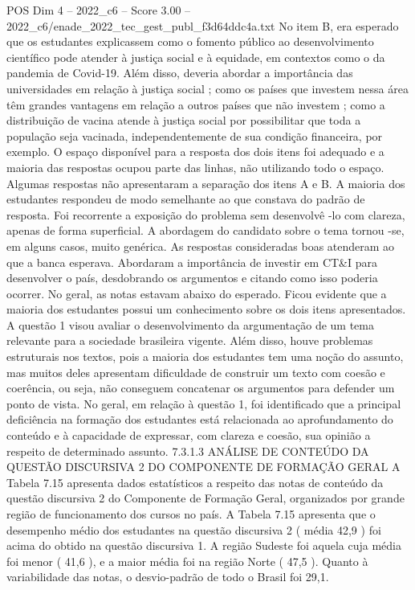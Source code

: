 \begin{textsample}{POS Dim 4 – 2022\_c6 – Score 3.00 – 2022\_c6/enade\_2022\_tec\_gest\_publ\_f3d64ddc4a.txt}
No item B, era esperado que os estudantes explicassem como o fomento público ao desenvolvimento científico pode atender à justiça social e à equidade, em contextos como o da pandemia de Covid-19.
Além disso, deveria abordar a importância das universidades em relação à justiça social ; como os países que investem nessa área têm grandes vantagens em relação a outros países que não investem ; como a distribuição de vacina atende à justiça social por possibilitar que toda a população seja vacinada, independentemente de sua condição financeira, por exemplo.
O espaço disponível para a resposta dos dois itens foi adequado e a maioria das respostas ocupou parte das linhas, não utilizando todo o espaço.
Algumas respostas não apresentaram a separação dos itens A e B.
A maioria dos estudantes respondeu de modo semelhante ao que constava do padrão de resposta.
Foi recorrente a exposição do problema sem desenvolvê -lo com clareza, apenas de forma superficial.
A abordagem do candidato sobre o tema tornou -se, em alguns casos, muito genérica.
As respostas consideradas boas atenderam ao que a banca esperava.
Abordaram a importância de investir em CT\&I para desenvolver o país, desdobrando os argumentos e citando como isso poderia ocorrer.
No geral, as notas estavam abaixo do esperado.
Ficou evidente que a maioria dos estudantes possui um conhecimento sobre os dois itens apresentados.
A questão 1 visou avaliar o desenvolvimento da argumentação de um tema relevante para a sociedade brasileira vigente.
Além disso, houve problemas estruturais nos textos, pois a maioria dos estudantes tem uma noção do assunto, mas muitos deles apresentam dificuldade de construir um texto com coesão e coerência, ou seja, não conseguem concatenar os argumentos para defender um ponto de vista.
No geral, em relação à questão 1, foi identificado que a principal deficiência na formação dos estudantes está relacionada ao aprofundamento do conteúdo e à capacidade de expressar, com clareza e coesão, sua opinião a respeito de determinado assunto. 7.3.1.3 ANÁLISE DE CONTEÚDO DA QUESTÃO DISCURSIVA 2 DO COMPONENTE DE FORMAÇÃO GERAL A Tabela 7.15 apresenta dados estatísticos a respeito das notas de conteúdo da questão discursiva 2 do Componente de Formação Geral, organizados por grande região de funcionamento dos cursos no país.
A Tabela 7.15 apresenta que o desempenho médio dos estudantes na questão discursiva 2 ( média 42,9 ) foi acima do obtido na questão discursiva 1.
A região Sudeste foi aquela cuja média foi menor ( 41,6 ), e a maior média foi na região Norte ( 47,5 ).
Quanto à variabilidade das notas, o desvio-padrão de todo o Brasil foi 29,1.

\end{textsample}
